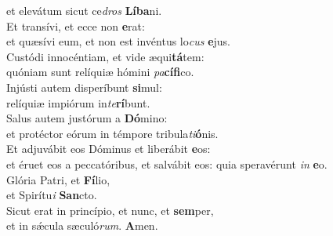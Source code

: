 \oddverse et elevátum sicut ce\textit{dros} \textbf{Lí}\textbf{ba}ni.\\
\evenverse Et transívi, et ecce non \textbf{e}rat:~\*\\
\evenverse et quæsívi eum, et non est invéntus lo\textit{cus} \textbf{e}jus.\\
\oddverse Custódi innocéntiam, et vide æqui\textbf{tá}tem:~\*\\
\oddverse quóniam sunt relíquiæ hómini \textit{pa}\textbf{cí}\textbf{fi}co.\\
\evenverse Injústi autem disperíbunt \textbf{si}mul:~\*\\
\evenverse relíquiæ impiórum in\textit{te}\textbf{rí}bunt.\\
\oddverse Salus autem justórum a \textbf{Dó}mino:~\*\\
\oddverse et protéctor eórum in témpore tribula\textit{ti}\textbf{ó}nis.\\
\evenverse Et adjuvábit eos Dóminus et liberábit \textbf{e}os:~\*\\
\evenverse et éruet eos a peccatóribus, et salvábit eos: quia speravérunt \textit{in} \textbf{e}o.\\
\oddverse Glória Patri, et \textbf{Fí}lio,~\*\\
\oddverse et Spirítu\textit{i} \textbf{San}cto.\\
\evenverse Sicut erat in princípio, et nunc, et \textbf{sem}per,~\*\\
\evenverse et in sǽcula sæculó\textit{rum}. \textbf{A}men.\\
